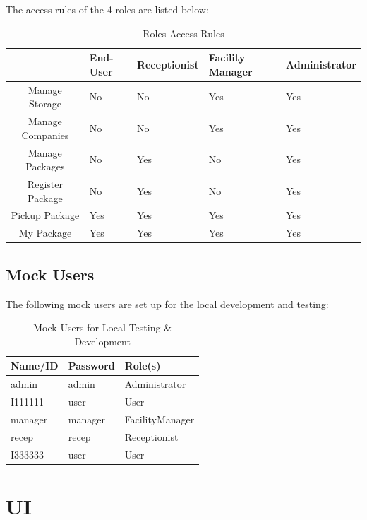 The access rules of the 4 roles are listed below:

\begin{table}[H]
    \centering
    \begin{tabular}{|c|m{2.1cm}|m{2.1cm}|m{2.1cm}|m{2.5cm}|} \hline 
         & End-User & Receptionist & Facility Manager & Administrator     \\ \hline 
         Manage Storage          & No & No & Yes & Yes \\ \hline 
         Manage Companies         & No & No & Yes & Yes \\ \hline 
         Manage Packages          & No & Yes & No  & Yes \\ \hline 
         Register Package       & No & Yes & No  & Yes \\ \hline 
         Pickup Package           & Yes & Yes & Yes & Yes \\ \hline
         My Package               & Yes & Yes & Yes & Yes \\ \hline
    \end{tabular}
    \caption{Roles Access Rules}
    \label{tab:Access Rule}
\end{table}
\subsection{Mock Users}

The following mock users are set up for the local development and testing:

\begin{table}[H]
    \centering
    \begin{tabular}{|m{2.5cm}|m{2.5cm}|m{3.5cm}|} \hline 
        \textbf{Name/ID} & \textbf{Password} & \textbf{Role(s)} \\ \hline 
        admin & admin & Administrator \\ \hline 
        I111111 & user & User \\ \hline 
        manager & manager & FacilityManager \\ \hline 
        recep & recep & Receptionist \\ \hline 
        I333333 & user & User \\ \hline
    \end{tabular}
    \caption{Mock Users for Local Testing \& Development}
\end{table}

\section{UI}
\label{sec:D-UI}

